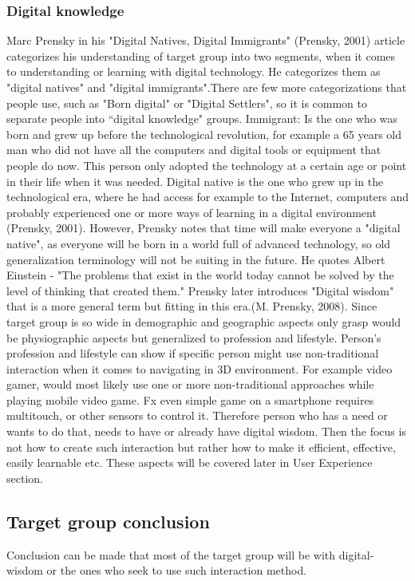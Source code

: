 \subsubsection{Digital knowledge}
Marc Prensky in his "Digital Natives, Digital Immigrants" (Prensky, 2001) article categorizes his understanding of target group into two segments, when it comes to understanding or learning with digital technology. He categorizes them as "digital natives" and "digital immigrants".There are few more categorizations that people use, such as "Born digital" or "Digital Settlers", so it is common to separate people into “digital knowledge" groups.  Immigrant: Is the one who was born and grew up before the technological revolution, for example a 65 years old man who did not have all the computers and digital tools or equipment that people do now. This person only adopted the technology at a certain age or point in their life when it was needed. Digital native is the one who grew up in the technological era, where he had access for example to the Internet, computers and probably experienced one or more ways of learning in a digital environment (Prensky, 2001). However, Prensky notes that time will make everyone a "digital native", as everyone will be born in a world full of advanced technology, so old generalization terminology will not be suiting in the future. He quotes Albert Einstein - "The problems that exist in the world today cannot be solved by the level of thinking that created them." Prensky later introduces "Digital wisdom" that is a more general term but fitting in this era.(M. Prensky, 2008). Since target group is so wide in demographic and geographic aspects only grasp would be physiographic aspects but generalized to profession and lifestyle. Person's profession and lifestyle can show if specific person might use non-traditional interaction when it comes to navigating in 3D environment. For example video gamer, would most likely use one or more non-traditional approaches while playing mobile video game. Fx even simple game on a smartphone requires multitouch, or other sensors to control it. 
Therefore person who has a need or wants to do that, needs to have or already have digital wisdom. Then the focus is not how to create such interaction but rather how to make it efficient, effective, easily learnable etc. These aspects will be covered later in User Experience section.

\subsection{Target group conclusion}
Conclusion can be made that most of the target group will be with digital-wisdom or the ones who seek to use such interaction method.
